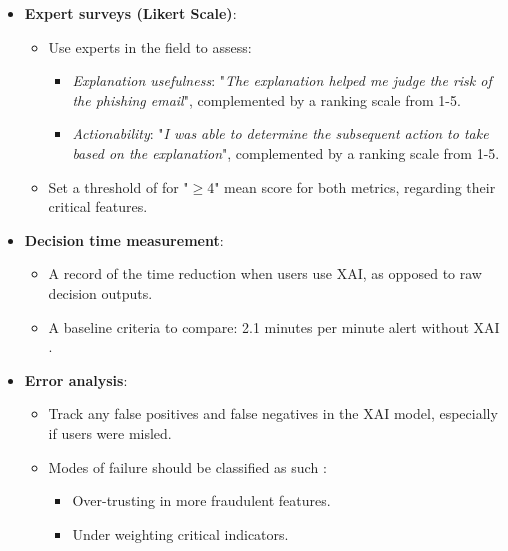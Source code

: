 \begin{itemize}
  \item \textbf{Expert surveys (Likert Scale)}:
  \begin{itemize}
    \item Use experts in the field to assess:
    \begin{itemize}
      \item \textit{Explanation usefulness}: "\textit{The explanation helped me judge the risk of the phishing email}", complemented by a ranking scale from 1-5.
      \item \textit{Actionability}: "\textit{I was able to determine the subsequent action to take based on the explanation}", complemented by a ranking scale from 1-5.
    \end{itemize}
    \item Set a threshold of for "\(\geq\)4" mean score for both metrics, regarding their critical features.
  \end{itemize}
  \item \textbf{Decision time measurement}:
  \begin{itemize}
    \item A record of the time reduction when users use XAI, as opposed to raw decision outputs.
    \item A baseline criteria to compare: 2.1 minutes per minute alert without XAI \citep{shirazi2022towards}.
  \end{itemize}
  \item \textbf{Error analysis}:
  \begin{itemize}
    \item Track any false positives and false negatives in the XAI model, especially if users were misled.
    \item Modes of failure should be classified as such \citep{lipton2018mythos}:
    \begin{itemize}
      \item Over-trusting in more fraudulent features.
      \item Under weighting critical indicators.
    \end{itemize}
  \end{itemize}
\end{itemize}
